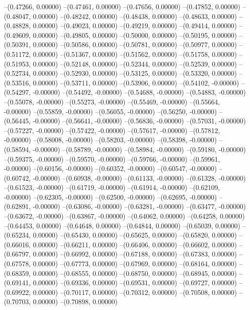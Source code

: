 --(0.47266, 0.00000)
--(0.47461, 0.00000)
--(0.47656, 0.00000)
--(0.47852, 0.00000)
--(0.48047, 0.00000)
--(0.48242, 0.00000)
--(0.48438, 0.00000)
--(0.48633, 0.00000)
--(0.48828, 0.00000)
--(0.49023, 0.00000)
--(0.49219, 0.00000)
--(0.49414, 0.00000)
--(0.49609, 0.00000)
--(0.49805, 0.00000)
--(0.50000, 0.00000)
--(0.50195, 0.00000)
--(0.50391, 0.00000)
--(0.50586, 0.00000)
--(0.50781, 0.00000)
--(0.50977, 0.00000)
--(0.51172, 0.00000)
--(0.51367, 0.00000)
--(0.51562, 0.00000)
--(0.51758, 0.00000)
--(0.51953, 0.00000)
--(0.52148, 0.00000)
--(0.52344, 0.00000)
--(0.52539, 0.00000)
--(0.52734, 0.00000)
--(0.52930, 0.00000)
--(0.53125, 0.00000)
--(0.53320, 0.00000)
--(0.53516, 0.00000)
--(0.53711, 0.00000)
--(0.53906, 0.00000)
--(0.54102, -0.00000)
--(0.54297, -0.00000)
--(0.54492, -0.00000)
--(0.54688, -0.00000)
--(0.54883, -0.00000)
--(0.55078, -0.00000)
--(0.55273, -0.00000)
--(0.55469, -0.00000)
--(0.55664, -0.00000)
--(0.55859, -0.00000)
--(0.56055, -0.00000)
--(0.56250, -0.00000)
--(0.56445, -0.00000)
--(0.56641, -0.00000)
--(0.56836, -0.00000)
--(0.57031, -0.00000)
--(0.57227, -0.00000)
--(0.57422, -0.00000)
--(0.57617, -0.00000)
--(0.57812, -0.00000)
--(0.58008, -0.00000)
--(0.58203, -0.00000)
--(0.58398, -0.00000)
--(0.58594, -0.00000)
--(0.58789, -0.00000)
--(0.58984, -0.00000)
--(0.59180, -0.00000)
--(0.59375, -0.00000)
--(0.59570, -0.00000)
--(0.59766, -0.00000)
--(0.59961, -0.00000)
--(0.60156, -0.00000)
--(0.60352, -0.00000)
--(0.60547, -0.00000)
--(0.60742, -0.00000)
--(0.60938, -0.00000)
--(0.61133, -0.00000)
--(0.61328, -0.00000)
--(0.61523, -0.00000)
--(0.61719, -0.00000)
--(0.61914, -0.00000)
--(0.62109, -0.00000)
--(0.62305, -0.00000)
--(0.62500, -0.00000)
--(0.62695, -0.00000)
--(0.62891, -0.00000)
--(0.63086, -0.00000)
--(0.63281, -0.00000)
--(0.63477, -0.00000)
--(0.63672, -0.00000)
--(0.63867, -0.00000)
--(0.64062, 0.00000)
--(0.64258, 0.00000)
--(0.64453, 0.00000)
--(0.64648, 0.00000)
--(0.64844, 0.00000)
--(0.65039, 0.00000)
--(0.65234, 0.00000)
--(0.65430, 0.00000)
--(0.65625, 0.00000)
--(0.65820, 0.00000)
--(0.66016, 0.00000)
--(0.66211, 0.00000)
--(0.66406, 0.00000)
--(0.66602, 0.00000)
--(0.66797, 0.00000)
--(0.66992, 0.00000)
--(0.67188, 0.00000)
--(0.67383, 0.00000)
--(0.67578, 0.00000)
--(0.67773, 0.00000)
--(0.67969, 0.00000)
--(0.68164, 0.00000)
--(0.68359, 0.00000)
--(0.68555, 0.00000)
--(0.68750, 0.00000)
--(0.68945, 0.00000)
--(0.69141, 0.00000)
--(0.69336, 0.00000)
--(0.69531, 0.00000)
--(0.69727, 0.00000)
--(0.69922, 0.00000)
--(0.70117, 0.00000)
--(0.70312, 0.00000)
--(0.70508, 0.00000)
--(0.70703, 0.00000)
--(0.70898, 0.00000)
